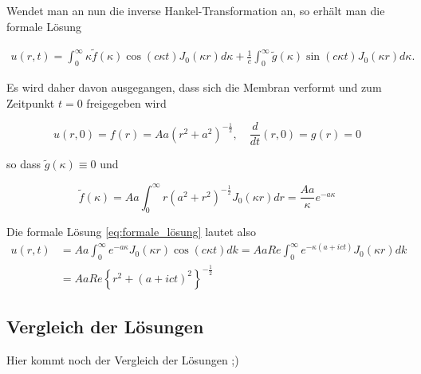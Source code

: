 Wendet man an nun die inverse Hankel-Transformation an, so erhält man die formale Lösung

\begin{align}
	u(r,t)=\int_{0}^{\infty}\kappa\tilde{f}(\kappa)\cos(c\kappa t) J_0(\kappa r) d\kappa +\frac{1}{c}\int_{0}^{\infty}\tilde{g}(\kappa)\sin(c\kappa t)J_0(\kappa r) d\kappa.
	\label{eq:formale_lösung}
\end{align}

Es wird daher davon ausgegangen, dass sich die Membran verformt und zum Zeitpunkt $t=0$ freigegeben wird

\begin{equation*}
	u(r,0)=f(r)=Aa(r^2 + a^2)^{-\frac{1}{2}}, \quad \frac{d}{dt}(r,0)=g(r)=0
\end{equation*}

so dass $\tilde{g}(\kappa)\equiv 0$ und

\begin{equation*}
	\tilde{f}(\kappa)=Aa\int_{0}^{\infty}r(a^2 + r^2)^{-\frac{1}{2}} J_0 (\kappa r) dr=\frac{Aa}{\kappa}e^{-a\kappa}
\end{equation*}

Die formale Lösung  \eqref{eq:formale_lösung} lautet also
\begin{align*}
	u(r,t)&=Aa\int_{0}^{\infty}e^{-a\kappa} J_0(\kappa r)\cos(c\kappa t)dk=AaRe\int_{0}^{\infty}e^{-\kappa(a+ict)} J_0(\kappa r)dk\\
	&=AaRe\left\{r^2+\left(a+ict\right)^2\right\}^{-\frac{1}{2}}
\end{align*}


\subsection{Vergleich der Lösungen
\label{kreismembran:vergleich}}
Hier kommt noch der Vergleich der Lösungen ;)


